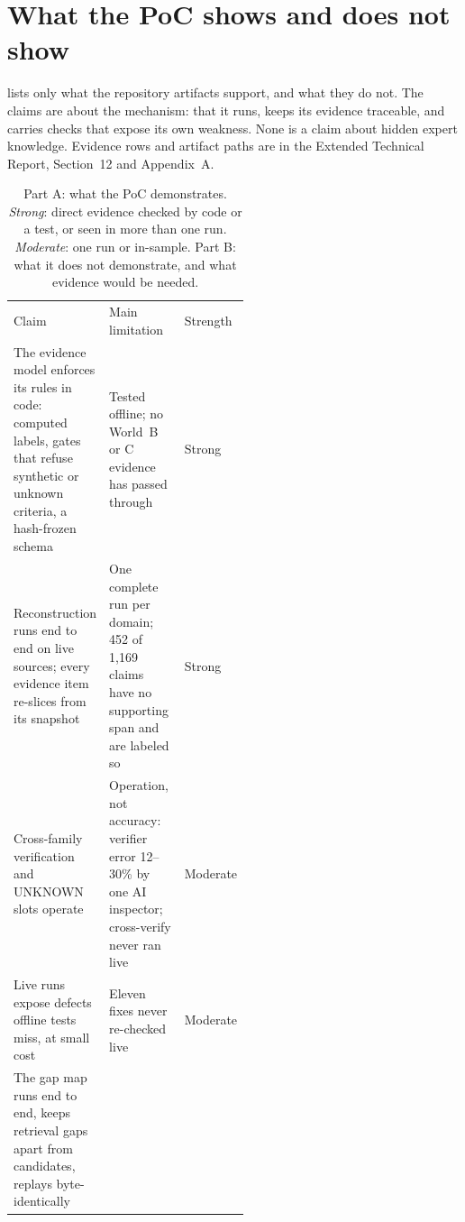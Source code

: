 \section{What the PoC shows and does not show}\label{sec:shows}

 lists only what the repository artifacts support, and what they do not. The claims
are about the mechanism: that it runs, keeps its evidence traceable, and carries checks that expose
its own weakness. None is a claim about hidden expert knowledge. Evidence rows and artifact paths are
in the Extended Technical Report, Section~12 and Appendix~A.

\begin{table}[htbp]
  \centering\footnotesize
  \caption[What the PoC shows and does not show]{Part A: what the PoC demonstrates.
    \emph{Strong}: direct evidence checked by code or a test, or seen in more than one run.
    \emph{Moderate}: one run or in-sample. Part B: what it does not demonstrate, and what evidence
    would be needed.}
  \label{tab:shows}
  \newcommand{\nb}[1]{\multicolumn{2}{>{\raggedright\arraybackslash}p{\dimexpr0.52\linewidth+2\tabcolsep\relax}@{}}{#1}}
  \begin{tabularx}{\linewidth}{@{}>{\raggedright\arraybackslash}X
      >{\raggedright\arraybackslash}p{0.42\linewidth}>{\raggedright\arraybackslash}p{0.1\linewidth}@{}}
    \toprule
    \multicolumn{3}{@{}l}{\textbf{A. Demonstrated} \evobs} \\
    \midrule
    Claim & Main limitation & Strength \\
    \midrule
    The evidence model enforces its rules in code: computed labels, gates that refuse synthetic or
      unknown criteria, a hash-frozen schema & Tested offline; no World~B or C evidence has passed
      through & Strong \\
    Reconstruction runs end to end on live sources; every evidence item re-slices from its snapshot &
      One complete run per domain; 452 of 1,169 claims have no supporting span and are labeled so &
      Strong \\
    Cross-family verification and UNKNOWN slots operate & Operation, not accuracy: verifier error
      12--30\% by one AI inspector; cross-verify never ran live & Moderate \\
    Live runs expose defects offline tests miss, at small cost & Eleven fixes never re-checked live &
      Moderate \\
    The gap map runs end to end, keeps retrieval gaps apart from candidates, replays byte-identically &

\end{tabularx}
\end{table}
